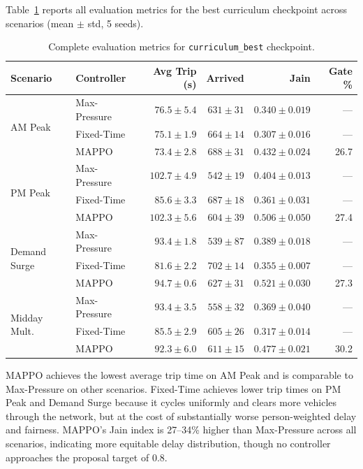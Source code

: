 \documentclass{article}
\begin{document}
Table~\ref{tab:full_metrics} reports all evaluation metrics for the best curriculum checkpoint across scenarios (mean $\pm$ std, 5 seeds).

\begin{table}[H]
  \centering
  \small
  \caption{Complete evaluation metrics for \texttt{curriculum\_best} checkpoint.}
  \label{tab:full_metrics}
  \begin{tabular}{@{}llrrrr@{}}
    \toprule
    \textbf{Scenario} & \textbf{Controller} & \textbf{Avg Trip (s)} & \textbf{Arrived} & \textbf{Jain} & \textbf{Gate \%} \\
    \midrule
    \multirow{3}{*}{AM Peak}
      & Max-Pressure & $76.5 \pm 5.4$ & $631 \pm 31$ & $0.340 \pm 0.019$ & --- \\
      & Fixed-Time   & $75.1 \pm 1.9$ & $664 \pm 14$ & $0.307 \pm 0.016$ & --- \\
      & MAPPO        & $73.4 \pm 2.8$ & $688 \pm 31$ & $0.432 \pm 0.024$ & 26.7 \\
    \midrule
    \multirow{3}{*}{PM Peak}
      & Max-Pressure & $102.7 \pm 4.9$ & $542 \pm 19$ & $0.404 \pm 0.013$ & --- \\
      & Fixed-Time   & $85.6 \pm 3.3$  & $687 \pm 18$ & $0.361 \pm 0.031$ & --- \\
      & MAPPO        & $102.3 \pm 5.6$ & $604 \pm 39$ & $0.506 \pm 0.050$ & 27.4 \\
    \midrule
    \multirow{3}{*}{Demand Surge}
      & Max-Pressure & $93.4 \pm 1.8$ & $539 \pm 87$ & $0.389 \pm 0.018$ & --- \\
      & Fixed-Time   & $81.6 \pm 2.2$ & $702 \pm 14$ & $0.355 \pm 0.007$ & --- \\
      & MAPPO        & $94.7 \pm 0.6$ & $627 \pm 31$ & $0.521 \pm 0.030$ & 27.3 \\
    \midrule
    \multirow{3}{*}{Midday Mult.}
      & Max-Pressure & $93.4 \pm 3.5$ & $558 \pm 32$ & $0.369 \pm 0.040$ & --- \\
      & Fixed-Time   & $85.5 \pm 2.9$ & $605 \pm 26$ & $0.317 \pm 0.014$ & --- \\
      & MAPPO        & $92.3 \pm 6.0$ & $611 \pm 15$ & $0.477 \pm 0.021$ & 30.2 \\
    \bottomrule
  \end{tabular}
\end{table}

MAPPO achieves the lowest average trip time on AM Peak and is comparable to Max-Pressure on other scenarios. Fixed-Time achieves lower trip times on PM Peak and Demand Surge because it cycles uniformly and clears more vehicles through the network, but at the cost of substantially worse person-weighted delay and fairness. MAPPO's Jain index is 27--34\% higher than Max-Pressure across all scenarios, indicating more equitable delay distribution, though no controller approaches the proposal target of 0.8.
\end{document}
